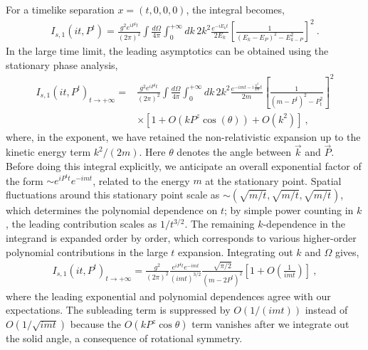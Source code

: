 \documentclass[a4paper,11pt]{article}
\begin{document}
For a timelike separation $x=(t,0,0,0)$, the integral becomes,
\begin{align}
I_{s,1}\left(i t, P^t\right)
= \frac{g^2 e^{i P^t t}}{(2\pi)^2} \int \frac{d\Omega}{4\pi}\int_{0}^{+\infty} d k \, 2k^2 \frac{e^{-i E_k t}}{2 E_k} \left[ \frac{1}{(E_k-E_P)^2-E^2_{k-P}} \right]^2    \ .  
\end{align}
In the large time limit, the leading asymptotics can be obtained using the stationary phase analysis,
\begin{align}\label{eq:It1calc}
I_{s,1}\left(i t, P^t\right)_{t\rightarrow+\infty} = & \frac{g^2 e^{i P^t t}}{(2\pi)^2} \int \frac{d\Omega}{4\pi}\int_{0}^{+\infty} d k \, 2k^2 \frac{e^{-i m t - i \frac{k^2}{2m} t}}{2 m} \left[ \frac{1}{(m-P^t)^2-P_t^2} \right]^2 \nonumber\\
&\times \left[1+O\left(k P^z \cos(\theta)\right) + O\left(k^2\right) \right] \ ,
\end{align}
where, in the exponent, we have retained the non-relativistic expansion up to the kinetic energy term $k^2/(2m)$. Here $\theta$ denotes the angle between $\vec{k}$ and $\vec{P}$. Before doing this integral explicitly, we anticipate an overall exponential factor of the form $\sim e^{i P^t t} e^{-i m t}$, related to the energy $m$ at the stationary point. Spatial fluctuations around this stationary point scale as $\sim\left(\sqrt{m/t},\sqrt{m/t},\sqrt{m/t}\right)$, which determines the polynomial dependence on $t$; by simple power counting in $k$, the leading contribution scales as $1/t^{3/2}$.  The remaining $k$-dependence in the integrand is expanded order by order, which corresponds to various higher-order polynomial contributions in the large $t$ expansion. Integrating out $k$ and $\Omega$ gives,
\begin{align}\label{eq:Is1timelike}
I_{s,1}\left(i t, P^t\right)_{t\rightarrow+\infty} = \frac{g^2}{(2\pi)^2} \frac{e^{i P^t t}e^{-i m t}}{(i m t)^{3/2}} \frac{\sqrt{\pi/2}}{(m-2 P^t)^2} \left[1+O\left(\frac{1}{i m t}\right)\right] \ ,
\end{align}
where the leading exponential and polynomial dependences agree with our expectations. The subleading term is suppressed by $O(1/(imt))$ instead of $O(1/\sqrt{i m t})$ because the $O(k P^z \cos{\theta})$ term vanishes after we integrate out the solid angle, a consequence of rotational symmetry. 
\end{document}
